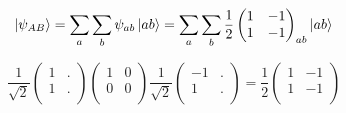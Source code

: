 \begin{equation*}
	\left| \psi_{AB} \right\rangle = \sum_a \sum_b \psi_{ab} \left| ab \right\rangle = \sum_a \sum_b \frac{1}{2}\begin{pmatrix}
	    1 & -1 \\
	    1 & -1 \\
	\end{pmatrix}_{ab}
	 \left| ab \right\rangle
\end{equation*}

\begin{equation*}
	\frac{1}{\sqrt{2}}\begin{pmatrix}
	    1 & . \\
	    1 & . \\
	\end{pmatrix}
	\begin{pmatrix}
	    1 & 0 \\
	    0 & 0 \\
	\end{pmatrix}
	\frac{1}{\sqrt{2}}
	\begin{pmatrix}
		    -1 & . \\
		    1 & . \\
		\end{pmatrix}
		=
		\frac{1}{2}
		\begin{pmatrix}
		    1 & -1 \\
		    1 & -1 \\
		\end{pmatrix}		
\end{equation*}